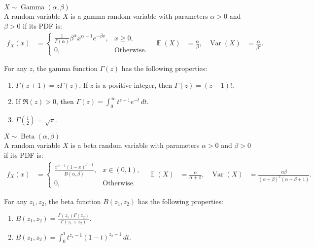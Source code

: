 \documentclass{huhtakm-template-book-v2}
\DeclareMathOperator{\E}{\mathbb{E}}
\DeclareMathOperator{\Var}{Var}
\DeclareMathOperator{\Gam}{Gamma}
\DeclareMathOperator{\Bet}{Beta}
\begin{document}
    \begin{eg} $X \sim \Gam(\alpha, \beta)$\\
        A random variable $X$ is a gamma random variable with parameters $\alpha > 0$ and $\beta > 0$ if its PDF is:
        \begin{align*}
            f_{X}(x) &= \begin{cases}
                \frac{1}{\Gamma(\alpha)} \beta^{\alpha} x^{\alpha - 1} e^{-\beta x}, &x \geq 0,\\
                0, &\text{Otherwise}.
            \end{cases} & \E(X) &= \frac{\alpha}{\beta}, & \Var(X) &= \frac{\alpha}{\beta^{2}}.
        \end{align*}
    \end{eg}
    \begin{rem}
        For any $z$, the gamma function $\Gamma(z)$ has the following properties:
        \begin{enumerate}
            \item $\Gamma(z + 1) = z\Gamma(z)$. If $z$ is a positive integer, then $\Gamma(z) = (z - 1)!$.
            \item If $\Re(z) > 0$, then $\Gamma(z) = \int_{0}^{\infty} t^{z - 1} e^{-t} \, dt$.
            \item $\Gamma\left(\frac{1}{2}\right) = \sqrt{\pi}$.
        \end{enumerate}
    \end{rem}
    \begin{eg} $X \sim \Bet(\alpha, \beta)$\\
        A random variable $X$ is a beta random variable with parameters $\alpha > 0$ and $\beta > 0$ if its PDF is: 
        \begin{align*}
            f_{X}(x) &= \begin{cases}
                \frac{x^{\alpha - 1} (1 - x)^{\beta - 1}}{B(\alpha, \beta)}, &x \in (0, 1),\\
                0, &\text{Otherwise}.
            \end{cases} & \E(X) &= \frac{\alpha}{\alpha + \beta}, & \Var(X) &= \frac{\alpha\beta}{(\alpha + \beta)^{2} (\alpha + \beta + 1)}.
        \end{align*}
    \end{eg}
    \begin{rem}
        For any $z_{1}, z_{2}$, the beta function $B(z_{1}, z_{2})$ has the following properties:
        \begin{enumerate}
            \item $B(z_{1}, z_{2}) = \frac{\Gamma(z_{1})\Gamma(z_{2})}{\Gamma(z_{1} + z_{2})}$.
            \item $B(z_{1}, z_{2}) = \int_{0}^{1} t^{z_{1} - 1} (1 - t)^{z_{2} - 1} \, dt$.
        \end{enumerate}
    \end{rem}
\end{document}
